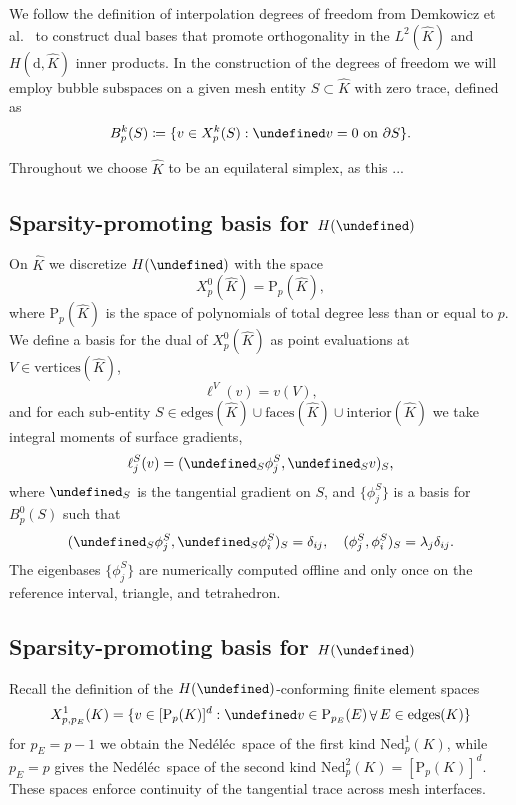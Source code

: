 \documentclass[review,onefignum,onetabnum,a4paper]{siamart190516}
\DeclareMathOperator*{\union}{\cup}
\let\grad\undefined
\let\curl\undefined
\let\tr\undefined
\DeclareMathOperator{\grad}{grad}
\DeclareMathOperator{\curl}{curl}
\DeclareMathOperator{\tr}{tr}
\DeclareMathOperator{\Forall}{\forall}
\newcommand{\Hgrad}{H(\grad)}
\newcommand{\Hcurl}{H(\curl)}
\newcommand{\Ltwo}{L^2}
\newcommand{\Khat}{\hat{K}}
\renewcommand{\P}{\mathrm{P}}
\newcommand{\Ned}{\mathrm{Ned}^{1}}
\newcommand{\NedTwo}{\mathrm{Ned}^{2}}
\newcommand{\Nedelec}{Ned\'el\'ec~}
\begin{document}
We follow the definition of interpolation degrees of freedom from
Demkowicz et al.~\cite{demkowicz00} to construct dual bases that promote orthogonality in the
$\Ltwo(\Khat)$ and $H(\mathrm{d}, \Khat)$ inner products.
In the construction of the degrees of freedom we will employ bubble subspaces on a given mesh entity $S \subset \Khat$ with zero trace, defined as
\begin{equation}
B^k_p(S) \coloneqq \{v \in X^k_p(S): \tr v = 0 \text{ on } \partial S\}.
\end{equation}

Throughout we choose $\Khat$ to be an equilateral simplex, as this ...

\subsection{Sparsity-promoting basis for $\Hgrad$}

On $\Khat$ we discretize $\Hgrad$ with the space
\begin{equation}
X^0_{p}(\Khat) = \P_p(\Khat),
\end{equation}
where $\P_p(\Khat)$ is the space of polynomials of total degree less than or equal to $p$.
We define a basis for the dual of $X^0_p(\Khat)$ as
point evaluations at $V \in \text{vertices}(\Khat)$,
\begin{equation}
   \ell^V(v) = v(V),
\end{equation}
and for each sub-entity $S \in \text{edges}(\Khat) \union \text{faces}(\Khat) \union \text{interior}(\Khat)$
we take integral moments of surface gradients, 
\begin{equation}
   \ell^S_j(v) = (\grad_S\phi^S_j, \grad_S v)_{S},
\end{equation}
where $\grad_S$ is the tangential gradient on $S$,
and $\{\phi^S_j\}$ is a basis for $B^0_p(S)$
such that
\begin{equation} \label{eq:hgrad-fdm}
   (\grad_S\phi^S_j, \grad_S\phi^S_i)_{S} = \delta_{ij}, \quad
   (\phi^S_j, \phi^S_i)_{S} = \lambda_j\delta_{ij}.
\end{equation}
The eigenbases $\{\phi^S_j\}$ are numerically computed offline and only once 
on the reference interval, triangle, and tetrahedron.


\subsection{Sparsity-promoting basis for $\Hcurl$}

Recall the definition of the $\Hcurl$-conforming finite element spaces
\begin{equation}
   X^1_{p, p_E}(K) = \{v\in [\P_p(K)]^d : \tr v \in \P_{p_E}(E) \Forall E \in \text{edges}(K)  \}
\end{equation}
for $p_E=p-1$ we obtain the \Nedelec space of the first kind $\Ned_p(K)$, while
$p_E=p$ gives the \Nedelec space of the second kind $\NedTwo_p(K) = [\P_p(K)]^d$. 
These spaces enforce continuity of the tangential trace across mesh interfaces.
\end{document}
